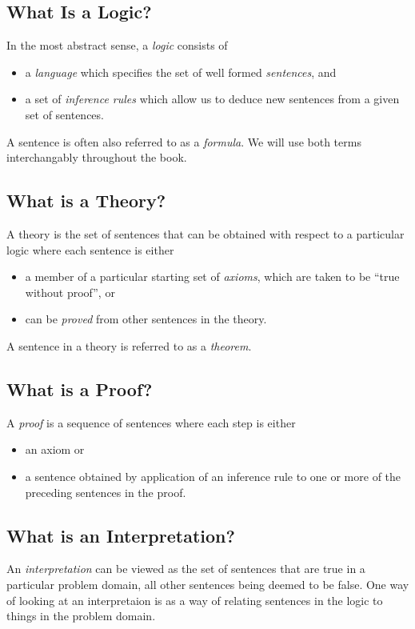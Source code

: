 \subsection{What Is a Logic?}

In the most abstract sense, a \emph{logic} consists of
\begin{itemize}
\item a \emph{language} which specifies the set of well formed
\emph{sentences}, and
\item a set of \emph{inference rules} which allow us to deduce new
sentences from a given set of sentences.
\end{itemize}
A sentence is often also referred to as a \emph{formula}.  We will use
both terms interchangably throughout the book.

\subsection{What is a Theory?}

A theory is the set of sentences that can be obtained with respect to a
particular logic where each sentence is either
\begin{itemize}
\item a member of a particular starting set of \emph{axioms}, which are
taken to be ``true without proof'', or
\item can be \emph{proved} from other sentences in the theory.
\end{itemize}
A sentence in a theory is referred to as a \emph{theorem}.

\subsection{What is a Proof?}

A \emph{proof} is a sequence of sentences where each step is either
\begin{itemize}
\item an axiom or
\item a sentence obtained by application of an inference rule to one or
more of the preceding sentences in the proof.
\end{itemize}

\subsection{What is an Interpretation?}

An \emph{interpretation} can be viewed as the set of sentences that are
true in a particular problem domain, all other sentences being deemed to
be false.  One way of looking at an interpretaion is as a way of
relating sentences in the logic to things in the problem domain.

